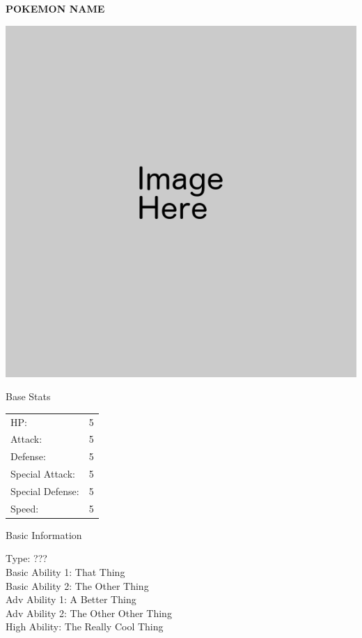 \documentclass{article}
\begin{document}
\begin{multicols}{2}
\noindent\textbf{POKEMON NAME} 

\noindent\includegraphics[width=0.9\linewidth]{Blank.png}

\begin{center}Base Stats\end{center}
\begin{tabular}{@{} l l }
HP: & 5\\
Attack: & 5\\
Defense: & 5\\
Special Attack: & 5\\
Special Defense: & 5\\
Speed: & 5\\
\end{tabular}
\begin{center}Basic Information\end{center}
Type: ???\\
Basic Ability 1: That Thing\\
Basic Ability 2: The Other Thing\\
Adv Ability 1: A Better Thing\\
Adv Ability 2: The Other Other Thing\\
High Ability: The Really Cool Thing\\


\end{multicols}
\end{document}
